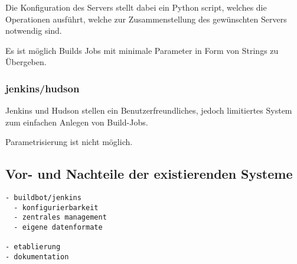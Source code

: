 Die Konfiguration des Servers stellt dabei ein Python script,
welches die Operationen ausführt, welche zur Zusammenstellung des gewünschten Servers notwendig sind.

Es ist möglich Builds Jobs mit minimale Parameter in Form von Strings zu Übergeben.

\subsubsection{jenkins/hudson}

Jenkins und Hudson stellen ein Benutzerfreundliches,
jedoch limitiertes System zum einfachen Anlegen von Build-Jobs.

Parametrisierung ist nicht möglich.

\subsection{Vor- und Nachteile der existierenden Systeme}

\begin{verbatim}
- buildbot/jenkins
  - konfigurierbarkeit
  - zentrales management
  - eigene datenformate

- etablierung
- dokumentation
\end{verbatim}


